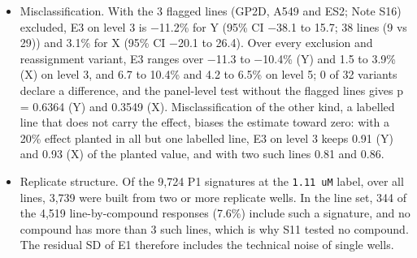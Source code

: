 \documentclass[
  11pt,
  letterpaper,
]{article}
\begin{document}
\begin{itemize}
  Weak templates. Response size divides by the squared length of the
  compound's mean response, which is small for weakly active compounds.
  With the weak-template quarter left out (86 of 115 compounds kept), E3
  on level 3 is −7.7\% for Y (95\% CI −28.1 to 12.8) and 2.7\% for X
  (95\% CI −17.9 to 23.3); with only the compounds above the median
  activity (57 of 115), 2.3\% and 11.3\%. On level 5 the same variants
  give 6.2\% and 9.4\% for Y. The Y-term estimate on level 3 moves
  toward zero, and changes sign, as weakly active compounds are left
  out, and 0 of 12 variants declare a difference.
\item
  Misclassification. With the 3 flagged lines (GP2D, A549 and ES2; Note
  S16) excluded, E3 on level 3 is −11.2\% for Y (95\% CI −38.1 to 15.7;
  38 lines (9 vs 29)) and 3.1\% for X (95\% CI −20.1 to 26.4). Over
  every exclusion and reassignment variant, E3 ranges over −11.3 to
  −10.4\% (Y) and 1.5 to 3.9\% (X) on level 3, and 6.7 to 10.4\% and 4.2
  to 6.5\% on level 5; 0 of 32 variants declare a difference, and the
  panel-level test without the flagged lines gives p = 0.6364 (Y) and
  0.3549 (X). Misclassification of the other kind, a labelled line that
  does not carry the effect, biases the estimate toward zero: with a
  20\% effect planted in all but one labelled line, E3 on level 3 keeps
  0.91 (Y) and 0.93 (X) of the planted value, and with two such lines
  0.81 and 0.86.
\item
  Replicate structure. Of the 9,724 P1 signatures at the
  \texttt{1.11\ uM} label, over all lines, 3,739 were built from two or
  more replicate wells. In the line set, 344 of the 4,519
  line-by-compound responses (7.6\%) include such a signature, and no
  compound has more than 3 such lines, which is why S11 tested no
  compound. The residual SD of E1 therefore includes the technical noise
  of single wells.
\end{itemize}
\end{document}
